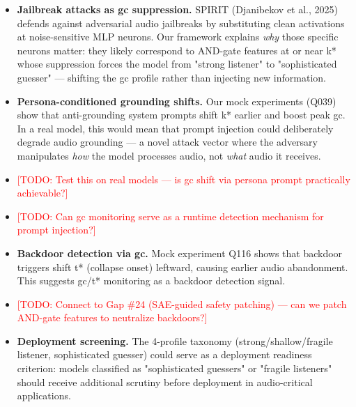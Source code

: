 \documentclass[a4paper]{article}
\begin{document}
{{\begin{itemize}
\item \textbf{Jailbreak attacks as gc suppression.} SPIRIT (Djanibekov et al., 2025) defends against adversarial audio jailbreaks by substituting clean activations at noise-sensitive MLP neurons. Our framework explains \textit{why} those specific neurons matter: they likely correspond to AND-gate features at or near k* whose suppression forces the model from "strong listener" to "sophisticated guesser" — shifting the gc profile rather than injecting new information.
\end{itemize}

\begin{itemize}
\item \textbf{Persona-conditioned grounding shifts.} Our mock experiments (Q039) show that anti-grounding system prompts shift k* earlier and boost peak gc. In a real model, this would mean that prompt injection could deliberately degrade audio grounding — a novel attack vector where the adversary manipulates \textit{how} the model processes audio, not \textit{what} audio it receives.
\item \textcolor{red}{[TODO: Test this on real models — is gc shift via persona prompt practically achievable?]}
\item \textcolor{red}{[TODO: Can gc monitoring serve as a runtime detection mechanism for prompt injection?]}
\end{itemize}

\begin{itemize}
\item \textbf{Backdoor detection via gc.} Mock experiment Q116 shows that backdoor triggers shift t* (collapse onset) leftward, causing earlier audio abandonment. This suggests gc/t* monitoring as a backdoor detection signal.
\item \textcolor{red}{[TODO: Connect to Gap \#24 (SAE-guided safety patching) — can we patch AND-gate features to neutralize backdoors?]}
\end{itemize}

\begin{itemize}
\item \textbf{Deployment screening.} The 4-profile taxonomy (strong/shallow/fragile listener, sophisticated guesser) could serve as a deployment readiness criterion: models classified as "sophisticated guessers" or "fragile listeners" should receive additional scrutiny before deployment in audio-critical applications.
\end{itemize}


}}
\end{document}
